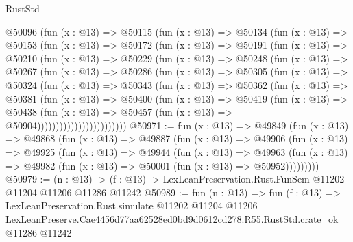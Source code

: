 \begin{lexlean}{RustStd}
\begin{coremodule}
          @50096
            (fun (x : @13) =>
            @50115
              (fun (x : @13) =>
              @50134
                (fun (x : @13) =>
                @50153
                  (fun (x : @13) =>
                  @50172
                    (fun (x : @13) =>
                    @50191
                      (fun (x : @13) =>
                      @50210
                        (fun (x : @13) =>
                        @50229
                          (fun (x : @13) =>
                          @50248
                            (fun (x : @13) =>
                            @50267
                              (fun (x : @13) =>
                              @50286
                                (fun (x : @13) =>
                                @50305
                                  (fun (x : @13) =>
                                  @50324
                                    (fun (x : @13) =>
                                    @50343
                                      (fun (x : @13) =>
                                      @50362
                                        (fun (x : @13) =>
                                        @50381
                                          (fun (x : @13) =>
                                          @50400
                                            (fun (x : @13) =>
                                            @50419
                                              (fun (x : @13) =>
                                              @50438
                                                (fun (x : @13) =>
                                                @50457
                                                  (fun (x : @13) => @50904))))))))))))))))))))))))
@50971 := fun (x : @13) =>
  @49849
    (fun (x : @13) =>
    @49868
      (fun (x : @13) =>
      @49887
        (fun (x : @13) =>
        @49906
          (fun (x : @13) =>
          @49925
            (fun (x : @13) =>
            @49944
              (fun (x : @13) =>
              @49963
                (fun (x : @13) => @49982 (fun (x : @13) => @50001 (fun (x : @13) => @50952)))))))))
@50979 := (n : @13) ->
  (f : @13) -> LexLeanPreservation.Rust.FunSem @11202 @11204 @11206 @11286 @11242
@50989 := fun (n : @13) =>
  fun (f : @13) =>
  LexLeanPreservation.Rust.simulate
    @11202
    @11204
    @11206
    LexLeanPreserve.Cae4456d77aa62528ed0bd9d0612cd278.R55.RustStd.crate_ok
    @11286
    @11242
\end{coremodule}
\end{lexlean}
